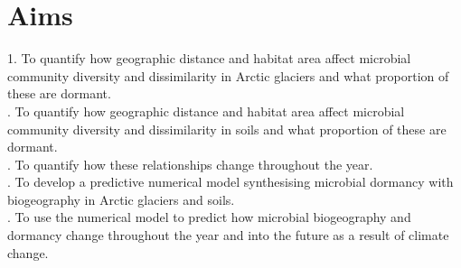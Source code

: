 \chapter{Aims}

1. To quantify how geographic distance and habitat area affect microbial community diversity and dissimilarity in Arctic glaciers and what proportion of these are dormant.\\

. To quantify how geographic distance and habitat area affect microbial community diversity and dissimilarity in soils and what proportion of these are dormant.\\

. To quantify how these relationships change throughout the year.\\

. To develop a predictive numerical model synthesising microbial dormancy with biogeography in Arctic glaciers and soils.\\

. To use the numerical model to predict how microbial biogeography and dormancy change throughout the year and into the future as a result of climate change.
